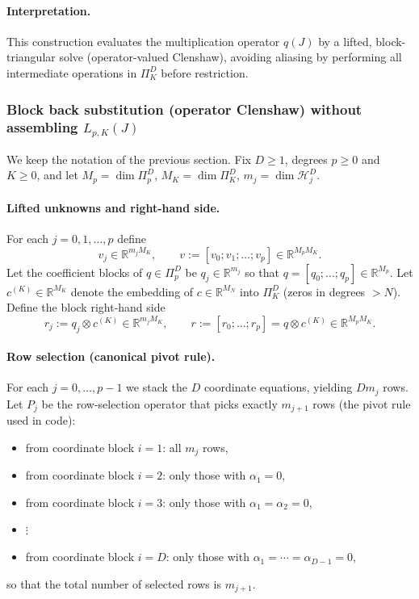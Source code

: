 \documentclass[11pt]{article}
\begin{document}
\paragraph{Interpretation.}
This construction evaluates the multiplication operator $q(J)$ by a lifted,
block-triangular solve (operator-valued Clenshaw), avoiding aliasing by performing
all intermediate operations in $\Pi_K^D$ before restriction.

\subsubsection{Block back substitution (operator Clenshaw) without assembling $L_{p,K}(J)$}

We keep the notation of the previous section.  Fix $D\ge 1$, degrees $p\ge 0$ and $K\ge 0$,
and let $M_p=\dim\Pi_p^D$, $M_K=\dim\Pi_K^D$, $m_j=\dim\mathcal H_j^D$.

\paragraph{Lifted unknowns and right-hand side.}
For each $j=0,1,\dots,p$ define
\[
v_j \in \mathbb{R}^{m_j M_K},
\qquad
v := [v_0;v_1;\dots;v_p] \in \mathbb{R}^{M_p M_K}.
\]
Let the coefficient blocks of $q\in\Pi_p^D$ be $q_j\in\mathbb{R}^{m_j}$ so that
$q=[q_0;\dots;q_p]\in\mathbb{R}^{M_p}$.
Let $c^{(K)}\in\mathbb{R}^{M_K}$ denote the embedding of $c\in\mathbb{R}^{M_N}$ into $\Pi_K^D$
(zeros in degrees $>N$).  Define the block right-hand side
\[
r_j := q_j \otimes c^{(K)} \in \mathbb{R}^{m_j M_K},
\qquad
r := [r_0;\dots;r_p] = q\otimes c^{(K)} \in \mathbb{R}^{M_p M_K}.
\]

\paragraph{Row selection (canonical pivot rule).}
For each $j=0,\dots,p-1$ we stack the $D$ coordinate equations, yielding $D m_j$ rows.
Let $P_j$ be the row-selection operator that picks exactly $m_{j+1}$ rows (the pivot rule used in code):
\begin{itemize}
	\item from coordinate block $i=1$: all $m_j$ rows,
	\item from coordinate block $i=2$: only those with $\alpha_1=0$,
	\item from coordinate block $i=3$: only those with $\alpha_1=\alpha_2=0$,
	\item $\vdots$
	\item from coordinate block $i=D$: only those with $\alpha_1=\cdots=\alpha_{D-1}=0$,
\end{itemize}
so that the total number of selected rows is $m_{j+1}$.
\end{document}
